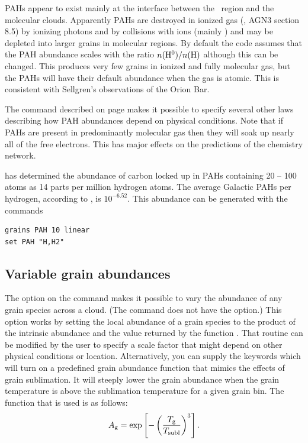 PAHs appear to exist mainly at the interface between
the \hplus\ region and the molecular clouds.
Apparently PAHs are destroyed in ionized gas (\citealp{Sellgren1990},
AGN3 section 8.5) by ionizing photons and by collisions with
ions (mainly \hplus) and may be depleted into larger grains in
molecular regions.
By default the code assumes that the PAH abundance scales with the ratio
$n( {\mbox{{\rm H}$^0$} })/n( {\mathrm{H}} )$ although this can be changed.
This produces very few grains in ionized and fully molecular gas,
but the PAHs will have their default abundance when the gas is atomic.
This is consistent with Sellgren's observations of the Orion Bar.

The  command
described on page \pageref{sec:CommandSetPahOption}
makes it possible to specify several other laws describing
how PAH abundances depend on physical conditions.
Note that if PAHs are present in predominantly molecular gas
then they will soak up nearly all of the free electrons.
This has major effects on the predictions of the chemistry network.

\citet{2008ARA&A..46..289T} has determined the abundance of carbon
locked up in PAHs containing 20 -- 100 atoms as 14 parts
per million hydrogen atoms.  
The average Galactic PAHs per hydrogen, according to \citet{2008ARA&A..46..289T}, 
is $10^{-6.52}$.  
This abundance can be generated with the  commands
\begin{verbatim}
grains PAH 10 linear
set PAH "H,H2"
\end{verbatim}

\subsection{Variable grain abundances}

The  option on the  command
makes it possible to vary the
abundance of any grain species across a cloud.
(The  command
does not have the  option.)
This option works by setting the local
abundance of a grain species to the product of the intrinsic abundance and
the value returned by the function .
That routine can be modified
by the user to specify a scale factor that might depend on other
physical conditions or location.
Alternatively, you can supply the keywords 
which will turn on a predefined grain abundance function that mimics
the effects of grain sublimation. It will steeply lower the grain abundance
when the grain temperature is above the sublimation temperature for a given
grain bin. The function that is used is as follows:
\[ A_{\rm g} = \exp \left[ - \left( \frac{T_{\rm g}}{T_{\rm subl}} \right)^3 \right]. \]


